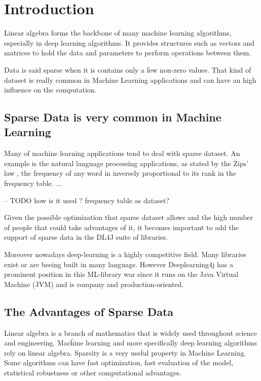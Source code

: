 \chapter{Introduction}


Linear algebra forms the backbone of many machine learning algorithms, especially in deep learning algorithms. It provides structures such as vectors and matrices to hold the data and parameters to perform operations between them. 

Data is said sparse when it is contains only a few non-zero values. That kind of dataset is really common in Machine Learning applications and can have an high influence on the computation. 

\section{Sparse Data is very common in Machine Learning}

Many of machine learning applications tend to deal with sparse dataset. An example is the natural language processing applications, as stated by the Zips' law \cite{Zipf}, the frequency of any word in inversely proportional to its rank in the frequency table. ... 

-- TODO how is it used ? frequency table as dataset?


Given the possible optimization that sparse dataset allows and the high number of people that could take advantages of it, it becomes important to add the support of sparse data in the DL4J suite of libraries. 

Moreover nowadays deep-learning is a highly competitive field. Many libraries exist or are beeing built in many language. However Deeplearning4j has a prominent position in this ML-library war since it runs on the Java Virtual Machine (JVM) and is company and production-oriented.



\section{The Advantages of Sparse Data}
Linear algebra is a branch of mathematics that is widely used throughout science and engineering. Macĥine learning and more specifically deep learning algorithms rely on linear algebra. Sparsity is a very useful property in Machine Learning. Some algorithms can have fast optimization, fast evaluation of the model, statistical robustness or other computational advantages.


